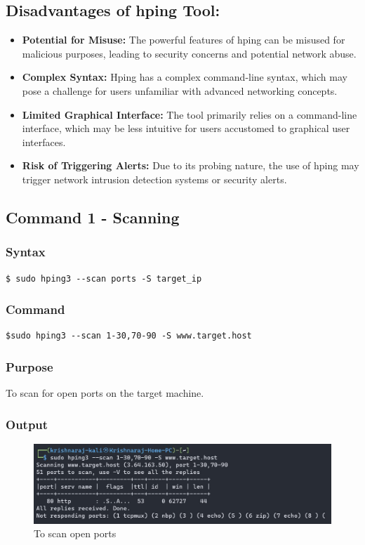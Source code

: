 \documentclass[11pt]{article}
\begin{document}
\subsection{Disadvantages of hping Tool:}
\begin{itemize}
    \item \textbf{Potential for Misuse:} The powerful features of hping can be misused for malicious purposes, leading to security concerns and potential network abuse.
    \item \textbf{Complex Syntax:} Hping has a complex command-line syntax, which may pose a challenge for users unfamiliar with advanced networking concepts.
    \item \textbf{Limited Graphical Interface:} The tool primarily relies on a command-line interface, which may be less intuitive for users accustomed to graphical user interfaces.
    \item \textbf{Risk of Triggering Alerts:} Due to its probing nature, the use of hping may trigger network intrusion detection systems or security alerts.
\end{itemize}

\subsection{Command 1 - Scanning}

\subsubsection*{Syntax}
\begin{verbatim}
$ sudo hping3 --scan ports -S target_ip
\end{verbatim}

\subsubsection*{Command}
\begin{verbatim}
$sudo hping3 --scan 1-30,70-90 -S www.target.host
\end{verbatim}

\subsubsection*{Purpose}
To scan for open ports on the target machine.

\subsubsection*{Output}
\begin{figure}[H]
    \centering
    \includegraphics[width=1.0\textwidth]{hping/hping scan.jpg}
    \caption{To scan open ports}
    \label{fig:1}
\end{figure}
\end{document}
